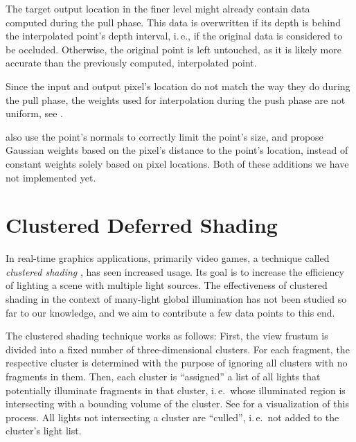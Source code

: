 The target output location in the finer level might already contain data computed during the pull phase. This data is overwritten if its depth is behind the interpolated point's depth interval, i.\,e., if the original data is considered to be occluded. Otherwise, the original point is left untouched, as it is likely more accurate than the previously computed, interpolated point.

Since the input and output pixel's location do not match the way they do during the pull phase, the weights used for interpolation during the push phase are not uniform, see .

 \citet{Marroquim:2007:reconstruction} also use the point's normals to correctly limit the point's size, and \citet{Marroquim:2008:reconstruction2} propose Gaussian weights based on the pixel's distance to the point's location, instead of constant weights solely based on pixel locations. Both of these additions we have not implemented yet.



\section{Clustered Deferred Shading}
\label{sec:concept:clusteredShading}

In real-time graphics applications, primarily video games, a technique called \textit{clustered shading} \citep{olsson2012clustered}, has seen increased usage. Its goal is to increase the efficiency of lighting a scene with multiple light sources.
The effectiveness of clustered shading in the context of many-light global illumination has not been studied so far to our knowledge, and we aim to contribute a few data points to this end.

The clustered shading technique works as follows: First, the view frustum is divided into a fixed number of three-dimensional clusters. For each fragment, the respective cluster is determined with the purpose of ignoring all clusters with no fragments in them. Then, each cluster is ``assigned'' a list of all lights that potentially illuminate fragments in that cluster, i.\,e.\, whose illuminated region is intersecting with a bounding volume of the cluster. See  for a visualization of this process. All lights not intersecting a cluster are ``culled'', i.\,e.\ not added to the cluster's light list.

